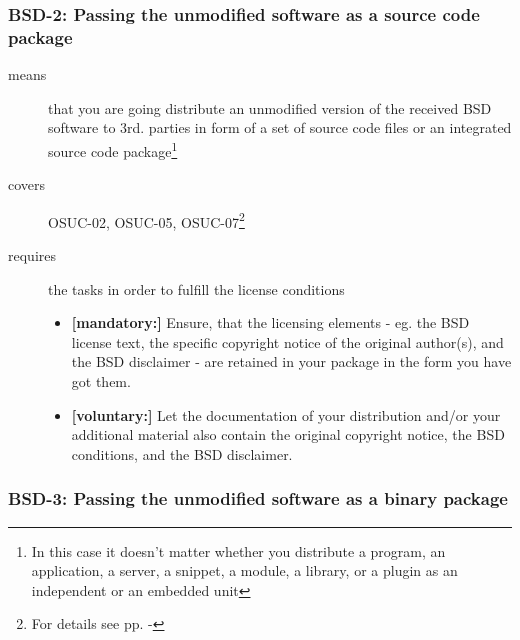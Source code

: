 \subsubsection{BSD-2: Passing the unmodified software as a source code package}
\label{OSUC-02-BSD} \label{OSUC-05-BSD} \label{OSUC-07-BSD} 

\begin{description}
\item[means] that you are going distribute an unmodified version of the received
BSD software to 3rd. parties in form of a set of source code files or an
integrated source code package\footnote{In this case it doesn't matter whether
you  distribute a program, an application, a server, a snippet, a module, a
library, or a plugin as an independent or an embedded unit} 

\item[covers] OSUC-02, OSUC-05, OSUC-07\footnote{For details see pp.
\pageref{OSUC-02-DEF} - \pageref{OSUC-07-DEF}}

\item[requires] the tasks in order to fulfill the license conditions
\begin{itemize}
  \item \textbf{[mandatory:]} Ensure, that the licensing elements - eg.
  the BSD license text, the specific copyright notice of the original author(s),
  and the BSD disclaimer - are retained in your package in the form you have got
  them.
  \item \textbf{[voluntary:]} Let the documentation of your distribution
  and/or your additional material also contain the original copyright notice, the
  BSD conditions, and the BSD disclaimer.
\end{itemize}
\end{description}

\subsubsection{BSD-3: Passing the unmodified software as a binary package}

